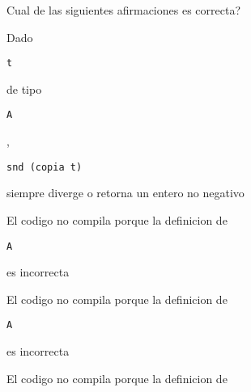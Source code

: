 \documentclass{gift}
\begin{document}
\begin{giftFragmento}
\end  {giftFragmento}


\begin{giftComentario}
 
\end  {giftComentario}

\begin{giftComentario}
 
\end  {giftComentario}
\begin{giftFragmento}
Cual de las siguientes afirmaciones es correcta?\end  {giftFragmento}


\begin{giftMO}
\item \begin{giftFragmento}
Dado\end  {giftFragmento}

\verb!t!
\begin{giftFragmento}
de tipo\end  {giftFragmento}

\verb!A!
\begin{giftFragmento}
,\end  {giftFragmento}

\verb!snd (copia t)!
\begin{giftFragmento}
siempre diverge o retorna un entero no negativo\end  {giftFragmento}


\item \begin{giftFragmento}
El codigo no compila porque la definicion de\end  {giftFragmento}

\verb!A!
\begin{giftFragmento}
es incorrecta\end  {giftFragmento}


\item \begin{giftFragmento}
El codigo no compila porque la definicion de\end  {giftFragmento}

\verb!A!
\begin{giftFragmento}
es incorrecta\end  {giftFragmento}


\item \begin{giftFragmento}
El codigo no compila porque la definicion de\end  {giftFragmento}


\end{giftMO}
\end{document}
